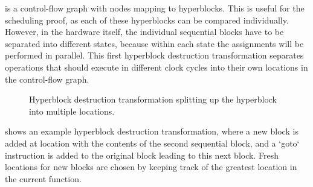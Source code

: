 \rtlpar{} is a control-flow graph with nodes mapping to hyperblocks.  This is
useful for the scheduling proof, as each of these hyperblocks can be compared
individually.  However, in the hardware itself, the individual sequential blocks
have to be separated into different states, because within each state the
assignments will be performed in parallel.  This first hyperblock destruction
transformation separates operations that should execute in different clock
cycles into their own locations in the control-flow graph.

\begin{figure}
  \centering
  \caption{Hyperblock destruction transformation splitting up the hyperblock into
    multiple locations.}%
  \label{fig:hg:hyperblock-destruction}
\end{figure}

 shows an example hyperblock destruction
transformation, where a new block is added at location  with the
contents of the second sequential block, and a \rtlinline`goto` instruction is
added to the original block leading to this next block.  Fresh locations for new
blocks are chosen by keeping track of the greatest location in the current
function.

